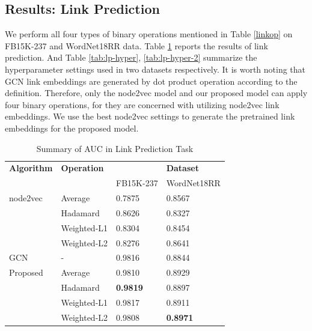 \documentclass[sigconf]{acmart}
\begin{document}
\subsection{Results: Link Prediction}
We perform all four types of binary operations mentioned in Table \ref{linkop} on FB15K-237 and WordNet18RR data. Table \ref{tab:lp} reports the results of link prediction. And Table \ref{tab:lp-hyper}, \ref{tab:lp-hyper-2} summarize the hyperparameter settings used in two datasets respectively. It is worth noting that GCN link embeddings are generated by dot product operation according to the definition. Therefore, only the node2vec model and our proposed model can apply four binary operations, for they are concerned with utilizing node2vec link embeddings. We use the best node2vec settings to generate the pretrained link embeddings for the proposed model.

\begin{table}[!ht]
    \centering
    \caption{Summary of AUC in Link Prediction Task}
    \label{tab:lp}
    \begin{tabular}{llll}
        \toprule
        \textbf{Algorithm} & \textbf{Operation} & &\textbf{Dataset} \\
                      & & FB15K-237 & WordNet18RR\\
        \midrule
        node2vec & Average & 0.7875 & 0.8567\\
                 & Hadamard & 0.8626 & 0.8327\\
                 & Weighted-L1 & 0.8304 & 0.8454\\
                 & Weighted-L2 & 0.8276 & 0.8641\\
        GCN & - & 0.9816 & 0.8844\\
        Proposed & Average & 0.9810 & 0.8929\\
                 & Hadamard & \textbf{0.9819} & 0.8897\\
                 & Weighted-L1 & 0.9817 & 0.8911\\
                 & Weighted-L2 & 0.9808 & \textbf{0.8971}\\
        \bottomrule
    \end{tabular}
\end{table}
\end{document}
